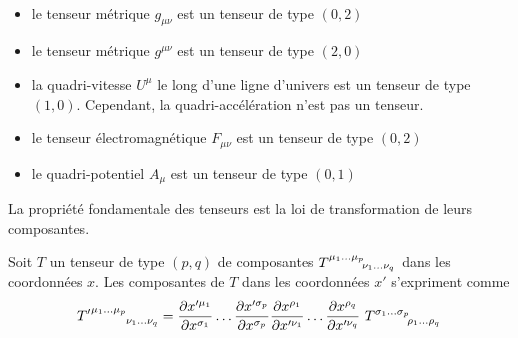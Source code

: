\documentclass[a4paper,11pt]{report}
\begin{document}
                \begin{exmp}${}$
                    \begin{itemize}[label = \textbullet]
                        \item le tenseur métrique $g_{\mu\nu}$ est un tenseur de type $(0,2)$
                        \item le tenseur métrique $g^{\mu\nu}$ est un tenseur de type $(2,0)$
                        \item la quadri-vitesse $U^{\mu}$ le long d'une ligne d'univers est un tenseur de type $(1,0)$. Cependant, la quadri-accélération n'est pas un tenseur.
                        \item le tenseur électromagnétique $F_{\mu\nu}$ est un tenseur de type $(0,2)$
                        \item le quadri-potentiel $A_{\mu}$ est un tenseur de type $(0,1)$
                    \end{itemize}
                \end{exmp}
                
                La propriété fondamentale des tenseurs est la loi de transformation de leurs composantes.
                
                \begin{prop}\begin{leftbar}
                    Soit $T$ un tenseur de type $(p,q)$ de composantes $T\indices{^{\mu_1\dots\mu_p}_{\nu_1\dots\nu_q}}$ dans les coordonnées $x$. Les composantes de $T$ dans les coordonnées $x'$ s'expriment comme 
                    \begin{equation}
                        {T'}\indices{^{\mu_1\dots\mu_p}_{\nu_1\dots\nu_q}} = \pdv{x'^{\mu_1}}{x^{\sigma_1}} (P)\dots\pdv{x'^{\sigma_p}}{x^{\sigma_p}}(P)\pdv{x^{\rho_1}}{x'^{\nu_1}}(P)\dots\pdv{x^{\rho_q}}{x'^{\nu_q}}(P)~T\indices{^{\sigma_1\dots\sigma_p}_{\rho_1\dots\rho_q}}
                    \end{equation}
                \end{leftbar}\end{prop}
                
\end{document}
